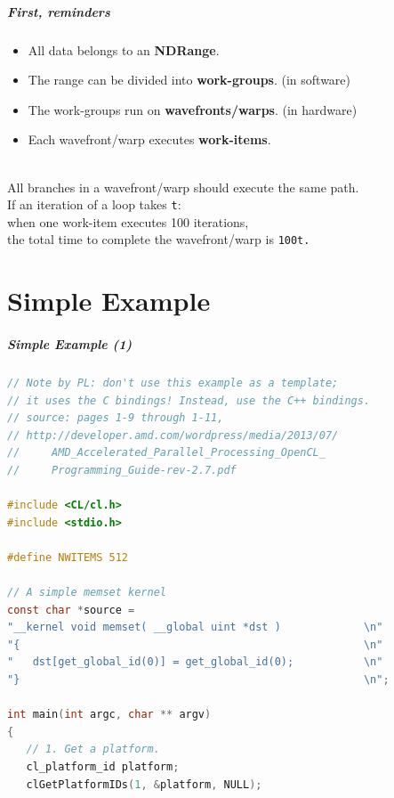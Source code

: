 \begin{frame}
  \frametitle{First, reminders}


  \begin{itemize}
    \item All data belongs to an {\bf NDRange}.
    \item The range can be divided into {\bf work-groups}. (in software)
    \item The work-groups run on {\bf wavefronts/warps}. (in hardware)
    \item Each wavefront/warp executes {\bf work-items}.
  \end{itemize}~\\[1em]

  \alert{All} branches in a wavefront/warp should execute the same path.~\\[1em]

  If an iteration of a loop takes {\tt t}:\\ when one work-item executes 100
    iterations,\\ the total time to complete the wavefront/warp is {\tt 100t.}

\end{frame}

\part{Simple Example}
\frame{\partpage}
\begin{frame}[fragile]
  \frametitle{Simple Example (1)}


\begin{lstlisting}[language=C]
// Note by PL: don't use this example as a template;
// it uses the C bindings! Instead, use the C++ bindings.
// source: pages 1-9 through 1-11,
// http://developer.amd.com/wordpress/media/2013/07/
//     AMD_Accelerated_Parallel_Processing_OpenCL_
//     Programming_Guide-rev-2.7.pdf

#include <CL/cl.h>
#include <stdio.h>

#define NWITEMS 512

// A simple memset kernel
const char *source =
"__kernel void memset( __global uint *dst )             \n"
"{                                                      \n"
"   dst[get_global_id(0)] = get_global_id(0);           \n"
"}                                                      \n";

int main(int argc, char ** argv)
{
   // 1. Get a platform.
   cl_platform_id platform;
   clGetPlatformIDs(1, &platform, NULL);
  \end{lstlisting}

\end{frame}

